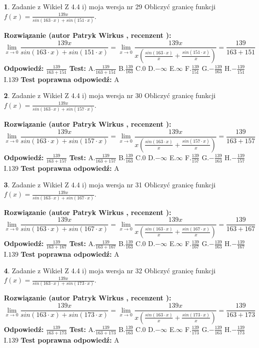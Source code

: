 \documentclass[12pt, a4paper]{article}
\theoremstyle{definition} %
\newtheorem{zad}{}
\newcommand{\zadStart}[1]{\begin{zad}#1\newline}
\newcommand{\zadStop}{\end{zad}}
\newcommand{\rozwStart}[2]{\noindent \textbf{Rozwiązanie (autor #1 , recenzent #2): }\newline}
\newcommand{\rozwStop}{\newline}
\newcommand{\odpStart}{\noindent \textbf{Odpowiedź:}\newline}
\newcommand{\odpStop}{\newline}
\newcommand{\testStart}{\noindent \textbf{Test:}\newline}
\newcommand{\testStop}{\newline}
\newcommand{\kluczStart}{\noindent \textbf{Test poprawna odpowiedź:}\newline}
\newcommand{\kluczStop}{\newline}
\begin{document}
\zadStart{Zadanie z Wikieł Z 4.4 i) moja wersja nr 29}
Obliczyć granicę funkcji $f(x)=\frac{139x}{sin(163\cdot x) +sin(151\cdot x)}$.
\zadStop
\rozwStart{Patryk Wirkus}{}
$$\lim\limits_{x\to 0}\frac{139x}{sin(163\cdot x) +sin(151\cdot x)}=\lim\limits_{x\to 0}\frac{139x}{x(\frac{sin(163\cdot x)}{x}+\frac{sin(151\cdot x)}{x})}=\frac{139}{163+151}$$
\rozwStop
\odpStart
$\frac{139}{163+151}$
\odpStop
\testStart
A.$\frac{139}{163+151}$
B.$\frac{139}{163}$
C.$0$
D.$-\infty$
E.$\infty$
F.$\frac{139}{151}$
G.$-\frac{139}{163}$
H.$-\frac{139}{151}$
I.$139$
\testStop
\kluczStart
A
\kluczStop



\zadStart{Zadanie z Wikieł Z 4.4 i) moja wersja nr 30}
Obliczyć granicę funkcji $f(x)=\frac{139x}{sin(163\cdot x) +sin(157\cdot x)}$.
\zadStop
\rozwStart{Patryk Wirkus}{}
$$\lim\limits_{x\to 0}\frac{139x}{sin(163\cdot x) +sin(157\cdot x)}=\lim\limits_{x\to 0}\frac{139x}{x(\frac{sin(163\cdot x)}{x}+\frac{sin(157\cdot x)}{x})}=\frac{139}{163+157}$$
\rozwStop
\odpStart
$\frac{139}{163+157}$
\odpStop
\testStart
A.$\frac{139}{163+157}$
B.$\frac{139}{163}$
C.$0$
D.$-\infty$
E.$\infty$
F.$\frac{139}{157}$
G.$-\frac{139}{163}$
H.$-\frac{139}{157}$
I.$139$
\testStop
\kluczStart
A
\kluczStop



\zadStart{Zadanie z Wikieł Z 4.4 i) moja wersja nr 31}
Obliczyć granicę funkcji $f(x)=\frac{139x}{sin(163\cdot x) +sin(167\cdot x)}$.
\zadStop
\rozwStart{Patryk Wirkus}{}
$$\lim\limits_{x\to 0}\frac{139x}{sin(163\cdot x) +sin(167\cdot x)}=\lim\limits_{x\to 0}\frac{139x}{x(\frac{sin(163\cdot x)}{x}+\frac{sin(167\cdot x)}{x})}=\frac{139}{163+167}$$
\rozwStop
\odpStart
$\frac{139}{163+167}$
\odpStop
\testStart
A.$\frac{139}{163+167}$
B.$\frac{139}{163}$
C.$0$
D.$-\infty$
E.$\infty$
F.$\frac{139}{167}$
G.$-\frac{139}{163}$
H.$-\frac{139}{167}$
I.$139$
\testStop
\kluczStart
A
\kluczStop



\zadStart{Zadanie z Wikieł Z 4.4 i) moja wersja nr 32}
Obliczyć granicę funkcji $f(x)=\frac{139x}{sin(163\cdot x) +sin(173\cdot x)}$.
\zadStop
\rozwStart{Patryk Wirkus}{}
$$\lim\limits_{x\to 0}\frac{139x}{sin(163\cdot x) +sin(173\cdot x)}=\lim\limits_{x\to 0}\frac{139x}{x(\frac{sin(163\cdot x)}{x}+\frac{sin(173\cdot x)}{x})}=\frac{139}{163+173}$$
\rozwStop
\odpStart
$\frac{139}{163+173}$
\odpStop
\testStart
A.$\frac{139}{163+173}$
B.$\frac{139}{163}$
C.$0$
D.$-\infty$
E.$\infty$
F.$\frac{139}{173}$
G.$-\frac{139}{163}$
H.$-\frac{139}{173}$
I.$139$
\testStop
\kluczStart
A
\kluczStop
\end{document}
